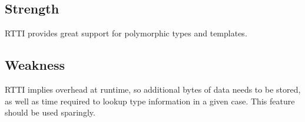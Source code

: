 \documentclass{article}
\begin{document}
 \subsection*{Strength}
 RTTI provides great support for polymorphic types
 and templates.
 
 \subsection*{Weakness}
 RTTI implies overhead at runtime, so additional bytes of data needs to be stored,
 as well as time required to lookup type information in a given case.
 This feature should be used sparingly.
 
\end{document}
